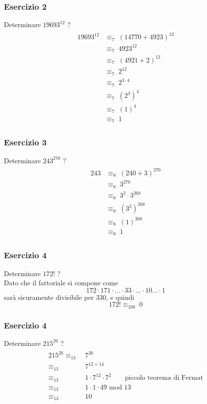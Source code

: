 \documentclass[italian]{article}
\newcommand{\mmod}{\text{ mod }}
\newcommand{\congruente}[1]{\text{$\equiv_{#1}\;$}}
\begin{document}
\subsubsection{Esercizio 2}
Determinare $19693^{12}$ \congruente{7} ?
\begin{gather*}
	\begin{split}
		19693^{12} &\congruente{7} (14770 + 4923)^{12} \\
		&\congruente{7} 4923^{12} \\
		&\congruente{7} (4921 + 2)^{12} \\
		&\congruente{7} 2^{12} \\
		&\congruente{7} 2^{3\cdot 4} \\
		&\congruente{7} (2^3)^4 \\
		&\congruente{7} (1)^4 \\
		&\congruente{7} 1
	\end{split}
\end{gather*}

\subsubsection{Esercizio 3}
Determinare $243^{270}$ \congruente{8} ?
\begin{gather*}
	\begin{split}
		243 &\congruente{8} (240 + 3)^{270} \\
		&\congruente{8} 3^{270} \\
		&\congruente{8} 3^2 \cdot 3^{268} \\
		&\congruente{8} (3^2)^{268} \\
		&\congruente{8} (1)^{268} \\
		&\congruente{8} 1
	\end{split}
\end{gather*}

\subsubsection{Esercizio 4}
Determinare $172!$ \congruente{330} ?\\[2mm]
Dato che il fattoriale si compone come
\[
	172\cdot 171 \cdot ... \cdot 33 \cdot ... \cdot 10 ... \cdot 1
\]
sarà sicuramente divisibile per 330, e quindi
\[
	172! \congruente{330} 0
\]

\subsubsection{Esercizio 4}
Determinare $215^{26}$ \congruente{13} ?
\begin{gather*}
	\begin{split}
		215^{26} \congruente{13}& 7^{26} \\
		\congruente{13}& 7^{12+14} \\
		\congruente{13}& 1\cdot 7^{12} \cdot 7^2 \qquad \text{piccolo teorema di Fermat}\\
		\congruente{13}& 1\cdot 1 \cdot 49 \mmod 13 \\
		\congruente{13}& 10
	\end{split}
\end{gather*}
\end{document}
